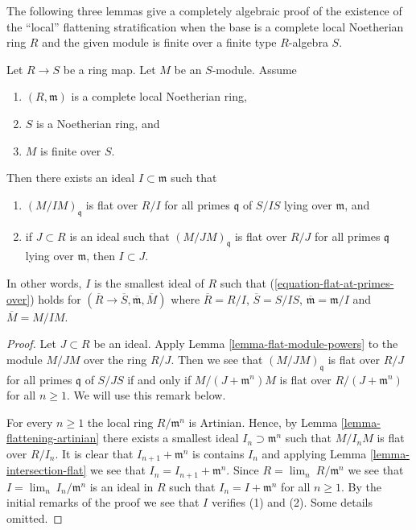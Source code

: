 \noindent
The following three lemmas give a completely algebraic proof of the existence
of the ``local'' flattening stratification when the base is a complete
local Noetherian ring $R$ and the given module is finite over a finite
type $R$-algebra $S$.

\begin{lemma}
\label{lemma-flattening-complete-local-noetherian}
Let $R \to S$ be a ring map.
Let $M$ be an $S$-module.
Assume
\begin{enumerate}
\item $(R, \mathfrak m)$ is a complete local Noetherian ring,
\item $S$ is a Noetherian ring, and
\item $M$ is finite over $S$.
\end{enumerate}
Then there exists an ideal $I \subset \mathfrak m$ such that
\begin{enumerate}
\item $(M/IM)_{\mathfrak q}$ is flat over $R/I$ for all
primes $\mathfrak q$ of $S/IS$ lying over $\mathfrak m$, and
\item if $J \subset R$ is an ideal such that $(M/JM)_{\mathfrak q}$
is flat over $R/J$ for all primes $\mathfrak q$ lying over
$\mathfrak m$, then $I \subset J$.
\end{enumerate}
In other words, $I$ is the smallest ideal of $R$ such that
(\ref{equation-flat-at-primes-over}) holds for
$(\overline{R} \to \overline{S}, \overline{\mathfrak m}, \overline{M})$
where $\overline{R} = R/I$, $\overline{S} = S/IS$,
$\overline{\mathfrak m} = \mathfrak m/I$ and $\overline{M} = M/IM$.
\end{lemma}

\begin{proof}
Let $J \subset R$ be an ideal. Apply
Lemma \ref{lemma-flat-module-powers}
to the module $M/JM$ over the ring $R/J$.
Then we see that $(M/JM)_{\mathfrak q}$
is flat over $R/J$ for all primes $\mathfrak q$ of $S/JS$
if and only if $M/(J + \mathfrak m^n)M$ is flat over
$R/(J + \mathfrak m^n)$ for all $n \geq 1$.
We will use this remark below.

\medskip\noindent
For every $n \geq 1$ the local ring $R/\mathfrak m^n$ is Artinian.
Hence, by
Lemma \ref{lemma-flattening-artinian}
there exists a smallest ideal $I_n \supset \mathfrak m^n$ such that
$M/I_nM$ is flat over $R/I_n$. It is clear that $I_{n + 1} + \mathfrak m^n$
is contains $I_n$ and applying
Lemma \ref{lemma-intersection-flat}
we see that $I_n = I_{n + 1} + \mathfrak m^n$. Since
$R = \lim_n\ R/\mathfrak m^n$ we see that $I = \lim_n\ I_n/\mathfrak m^n$
is an ideal in $R$ such that $I_n = I + \mathfrak m^n$ for all $n \geq 1$.
By the initial remarks of the proof we see that $I$ verifies (1)
and (2). Some details omitted.
\end{proof}

